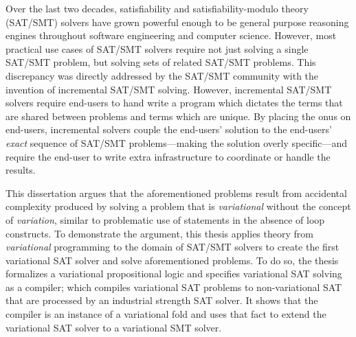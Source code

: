 Over the last two decades, satisfiability and satisfiability-modulo theory
(SAT/SMT) solvers have grown powerful enough to be general purpose reasoning
engines throughout software engineering and computer science. However, most
practical use cases of SAT/SMT solvers require not just solving a single SAT/SMT
problem, but solving sets of related SAT/SMT problems. This discrepancy was
directly addressed by the SAT/SMT community with the invention of incremental
SAT/SMT solving. However, incremental SAT/SMT solvers require end-users to hand
write a program which dictates the terms that are shared between problems and
terms which are unique. By placing the onus on end-users, incremental solvers
couple the end-users' solution to the end-users' \emph{exact} sequence of
SAT/SMT problems---making the solution overly specific---and require the
end-user to write extra infrastructure to coordinate or handle the results.

This dissertation argues that the aforementioned problems result from accidental
complexity produced by solving a problem that is \emph{variational} without the
concept of \emph{variation}, similar to problematic use of  statements
in the absence of  loop constructs. To demonstrate the argument, this
thesis applies theory from \emph{variational} programming to the domain of
SAT/SMT solvers to create the first variational SAT solver and solve
aforementioned problems.
%
To do so, the thesis formalizes a variational propositional logic and specifies
variational SAT solving as a compiler; which compiles variational SAT problems
to non-variational SAT that are processed by an industrial strength SAT solver.
It shows that the compiler is an instance of a variational fold and uses that
fact to extend the variational SAT solver to a variational SMT solver.


